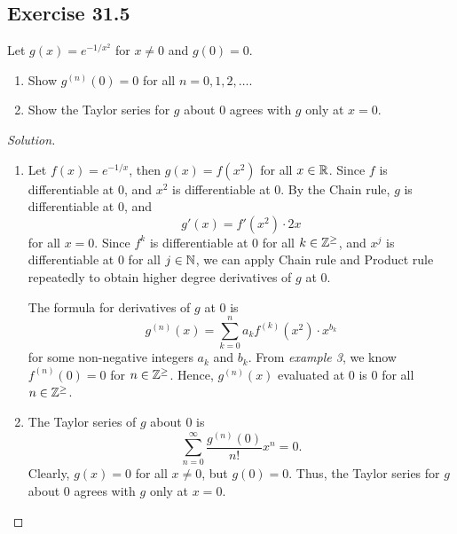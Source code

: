 \documentclass{article}
\begin{document}
\subsection*{Exercise 31.5}
Let $g(x)=e^{-1/x^2}$ for $x\neq 0$ and $g(0)=0$.
\begin{enumerate}[label=\tb{(\alph*)}]
    \item Show $g^{(n)}(0)=0$ for all $n=0,1,2,\dots$.
    \item Show the Taylor series for $g$ about 0 agrees with $g$ only at $x=0$.
\end{enumerate}
\begin{proof}[Solution]\indent
    \begin{enumerate}[label=\tb{(\alph*)}]
        \item
        Let \(f(x)=e^{-1/x}\), then $g(x)=f(x^2)$ for all $x\in\mathbb{R}$. Since $f$ is differentiable at 0,
        and $x^2$ is differentiable at 0. By the Chain rule, $g$ is differentiable at 0, and
        \[
            g'(x)=f'(x^2)\cdot 2x
        \]
        for all $x=0$. Since $f^k$ is differentiable at 0 for all $k\in\mathbb{Z}^{\ge}$, and $x^j$ is 
        differentiable at 0 for all $j\in\mathbb{N}$, we can apply Chain rule and Product rule repeatedly 
        to obtain higher degree derivatives of $g$ at 0. 

        The formula for derivatives of $g$ at 0 is
        \[
            g^{(n)}(x)=\sum_{k=0}^n a_kf^{(k)}(x^2)\cdot x^{b_k}
        \]
        for some non-negative integers $a_k$ and $b_k$. 
        From \emph{example 3}, we know $f^{(n)}(0)=0$ for $n\in\mathbb{Z}^\ge$. Hence, $g^{(n)}(x)$ evaluated at 0 is 0 for 
        all $n\in\mathbb{Z}^\ge$.
        
        \item
        The Taylor series of $g$ about 0 is 
        \[
            \sum_{n=0}^\infty \frac{g^{(n)}(0)}{n!}x^n=0.
        \]
        Clearly, $g(x)=0$ for all $x\neq 0$, but $g(0)=0$. Thus, the Taylor series
        for $g$ about 0 agrees with $g$ only at $x=0$.
    \end{enumerate}    
\end{proof}

\newpage
\end{document}

